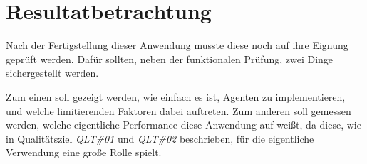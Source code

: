 \section{Resultatbetrachtung} \label{sec:reflection-main}

Nach der Fertigstellung dieser Anwendung musste diese noch auf ihre Eignung geprüft werden.
Dafür sollten, neben der funktionalen Prüfung, zwei Dinge sichergestellt werden.

Zum einen soll gezeigt werden, wie einfach es ist, Agenten zu implementieren, und welche limitierenden Faktoren dabei auftreten.
Zum anderen soll gemessen werden, welche eigentliche Performance diese Anwendung auf weißt, da diese, wie in Qualitätsziel \textit{QLT\#01} und \textit{QLT\#02} beschrieben, für die eigentliche Verwendung eine große Rolle spielt.
